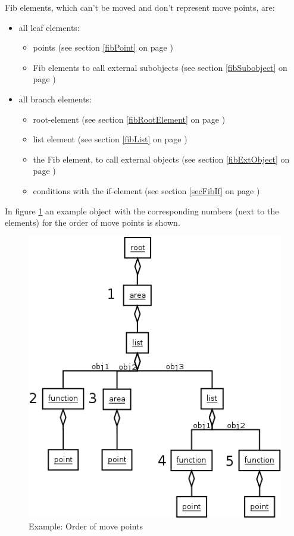 \bigskip\noindent
Fib elements, which can't be moved and don't represent move points, are:
\begin{itemize}
 \item all leaf elements:
 \begin{itemize}
  \item points (see section \ref{fibPoint} on page \pageref{fibPoint})
  \item Fib elements to call external subobjects (see section \ref{fibSubobject} on page \pageref{fibSubobject})
 \end{itemize}
 \item all branch elements:
 \begin{itemize}
  \item root-element (see section \ref{fibRootElement} on page \pageref{fibRootElement})
  \item list element (see section \ref{fibList} on page \pageref{fibList})
  \item the Fib element, to call external objects (see section \ref{fibExtObject} on page \pageref{fibExtObject})
  \item conditions with the if-element (see section \ref{secFibIf} on page \pageref{secFibIf})
 \end{itemize}
\end{itemize}

In figure \ref{figOrderMovePoints} an example object with the corresponding numbers (next to the elements) for the order of move points is shown.

\begin{figure}[htbp]
\begin{center}
  \includegraphics[scale=0.5]{order_move_points}
\end{center}
\caption{Example: Order of move points}
\label{figOrderMovePoints}
\end{figure}


